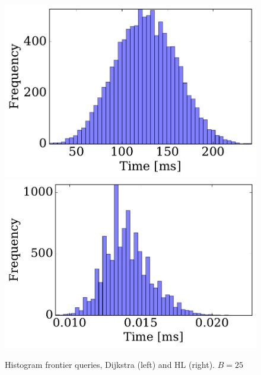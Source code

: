 \begin{figure} \caption{Histogram frontier queries, Dijkstra (left) and HL (right). $B=25$}\label{fig:SF_query}
\begin{center}
\includegraphics[clip, trim=0.2cm 0.3cm 0.2cm 0.2cm,scale=0.29]{TexImg/SF_query_dij_B25.pdf}
\includegraphics[clip, trim=1cm 0.3cm 0.2cm 0.2cm,scale=0.29]{TexImg/SF_query_hl_B25.pdf}
\end{center}
\end{figure}



